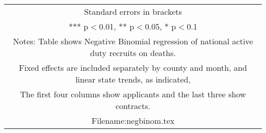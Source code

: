 \documentclass[]{article}
\begin{document}
\begin{tabular}{lcccccc}
\multicolumn{7}{c}{ Standard errors in brackets} \\
\multicolumn{7}{c}{ *** p$<$0.01, ** p$<$0.05, * p$<$0.1} \\
\multicolumn{7}{c}{ Notes: Table shows Negative Binomial regression of national active duty recruits on deaths.} \\
\multicolumn{7}{c}{ Fixed effects are included separately by county and month, and linear state trends, as indicated,} \\
\multicolumn{7}{c}{ The first four columns show applicants and the last three show contracts.} \\
\multicolumn{7}{c}{ Filename:negbinom.tex} \\
\end{tabular}
\end{document}
